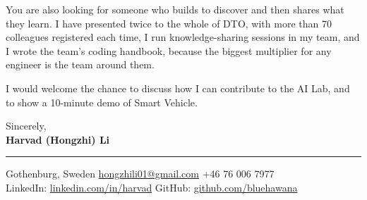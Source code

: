 \documentclass[a4paper,10pt]{article}
\begin{document}
You are also looking for someone who builds to discover and then shares what they learn. I have presented twice to the whole of DTO, with more than 70 colleagues registered each time, I run knowledge-sharing sessions in my team, and I wrote the team's coding handbook, because the biggest multiplier for any engineer is the team around them.


I would welcome the chance to discuss how I can contribute to the AI Lab, and to show a 10-minute demo of Smart Vehicle.

\vspace{6pt}

Sincerely,\\[10pt]
\textbf{Harvad (Hongzhi) Li}

\vspace{10pt}
{\color{darkblue}\rule{\linewidth}{0.6pt}}

{\color{darkblue}\small
Gothenburg, Sweden \textbar{} \href{mailto:hongzhili01@gmail.com}{hongzhili01@gmail.com} \textbar{} +46 76 006 7977\\
LinkedIn: \href{https://www.linkedin.com/in/harvad/}{linkedin.com/in/harvad} \textbar{} GitHub: \href{https://github.com/bluehawana}{github.com/bluehawana}
}
\end{document}
